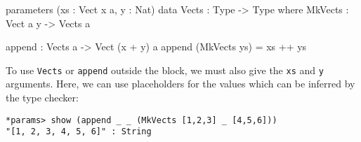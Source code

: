 \begin{code}
parameters (xs : Vect x a, y : Nat)
    data Vects : Type -> Type where
         MkVects : Vect a y -> Vects a
  
    append : Vects a -> Vect (x + y) a
    append (MkVects ys) = xs ++ ys
\end{code}

\noindent
To use \texttt{Vects} or \texttt{append} outside the block, we must also give the \texttt{xs} and \texttt{y} arguments.
Here, we can use placeholders for the values which can be inferred by the type checker:

\begin{lstlisting}[style=stdout]
*params> show (append _ _ (MkVects [1,2,3] _ [4,5,6]))
"[1, 2, 3, 4, 5, 6]" : String
\end{lstlisting}

